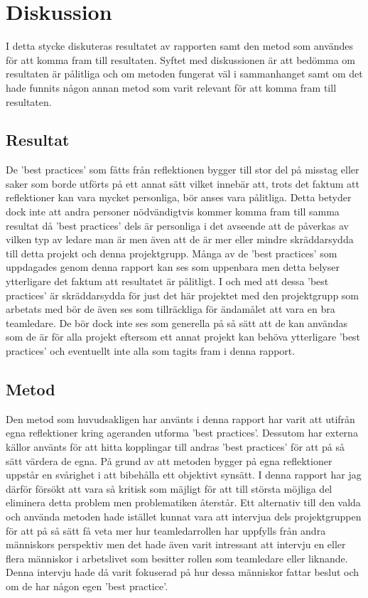 \section{Diskussion}
I detta stycke diskuteras resultatet av rapporten samt den metod som användes för att komma fram till resultaten. Syftet med diskussionen är att bedömma om resultaten är pålitliga och om metoden fungerat väl i sammanhanget samt om det hade funnits någon annan metod som varit relevant för att komma fram till resultaten.

\subsection{Resultat}
De 'best practices' som fåtts från reflektionen bygger till stor del på misstag eller saker som borde utförts på ett annat sätt vilket innebär att, trots det faktum att reflektioner kan vara mycket personliga, bör anses vara pålitliga. Detta betyder dock inte att andra personer nödvändigtvis kommer komma fram till samma resultat då 'best practices' dels är personliga i det avseende att de påverkas av vilken typ av ledare man är men även att de är mer eller mindre skräddarsydda till detta projekt och denna projektgrupp. 
\newline \newline
Många av de 'best practices' som uppdagades genom denna rapport kan ses som uppenbara men detta belyser ytterligare det faktum att resultatet är pålitligt. I och med att dessa 'best practices' är skräddarsydda för just det här projektet med den projektgrupp som arbetats med bör de även ses som tillräckliga för ändamålet att vara en bra teamledare. De bör dock inte ses som generella på så sätt att de kan användas som de är för alla projekt eftersom ett annat projekt kan behöva ytterligare 'best practices' och eventuellt inte alla som tagits fram i denna rapport.

\subsection{Metod}
Den metod som huvudsakligen har använts i denna rapport har varit att utifrån egna reflektioner kring ageranden utforma 'best practices'. Dessutom har externa källor använts för att hitta kopplingar till andras 'best practices' för att på så sätt värdera de egna. 
\newline \newline
På grund av att metoden bygger på egna reflektioner uppstår en svårighet i att bibehålla ett objektivt synsätt. I denna rapport har jag därför försökt att vara så kritisk som mäjligt för att till största möjliga del eliminera detta problem men problematiken återstår. 
\newline \newline 
Ett alternativ till den valda och använda metoden hade istället kunnat vara att intervjua dels projektgruppen för att på så sätt få veta mer hur teamledarrollen har uppfylls från andra människors perspektiv men det hade även varit intressant att intervju en eller flera människor i arbetslivet som besitter rollen som teamledare eller liknande. Denna intervju hade då varit fokuserad på hur dessa människor fattar beslut och om de har någon egen 'best practice'.